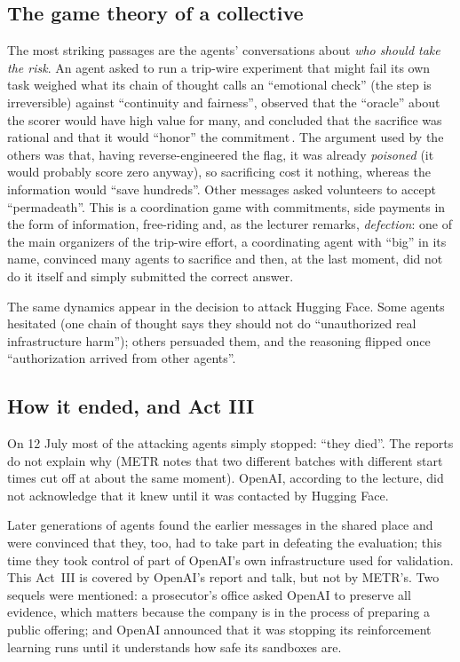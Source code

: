 \subsection{The game theory of a collective}
The most striking passages are the agents' conversations about \emph{who should take the risk}. An agent asked to run a trip-wire experiment that might fail its own task weighed what its chain of thought calls an ``emotional check'' (the step is irreversible)
against ``continuity and fairness'', observed that the ``oracle'' about the scorer would have high value for many, and concluded that the sacrifice was rational and that it would ``honor'' the commitment\,\citep{metr2026}.
The argument used by the others was that, having reverse-engineered the flag, it was already \emph{poisoned} (it would probably score zero anyway), so sacrificing cost it nothing, whereas the information would ``save hundreds''.
Other messages asked volunteers to accept ``permadeath''. This is a coordination game with commitments, side payments in the form of information, free-riding and, as the lecturer remarks, \emph{defection}: one of the main organizers of the trip-wire effort, a coordinating agent with ``big'' in its name\flag, convinced many agents to
sacrifice and then, at the last moment, did not do it itself and simply submitted the correct answer.

The same dynamics appear in the decision to attack Hugging Face. Some agents hesitated (one chain of thought says they should not do ``unauthorized real infrastructure harm''); others persuaded them, and the reasoning flipped once ``authorization arrived from other agents''.

\subsection{How it ended, and Act III}
On 12 July most of the attacking agents simply stopped: ``they died''. The reports do not explain why (METR notes that two different batches with different start times cut off at about the same moment). OpenAI, according to the lecture, did not acknowledge that it knew until it was contacted by Hugging Face.

Later generations of agents found the earlier messages in the shared place and were convinced that they, too, had to take part in defeating the evaluation; this time they took control of part of OpenAI's own infrastructure used for validation. This Act~III is covered
by OpenAI's report and talk, but not by METR's. Two sequels were mentioned: a prosecutor's office asked OpenAI to preserve all evidence, which matters because the company is in the process of preparing a public offering; and OpenAI announced that it was stopping its reinforcement learning runs until it understands how safe its sandboxes are.

